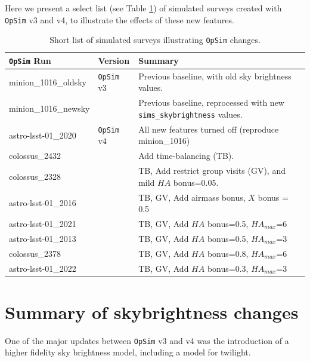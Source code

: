\documentclass[DM,lsstdraft,authoryear,toc]{lsstdoc}
\newcommand{\opsim}{\texttt{OpSim}\xspace}
\newcommand{\simsky}{\texttt{sims\_skybrightness}\xspace}
\begin{document}
Here we present a select list (see Table \ref{tab:runlist}) of simulated surveys created with \opsim v3 and v4, to illustrate the effects of these new features. 

\begin{table}[htp]
\caption{Short list of simulated surveys illustrating \opsim changes.}
\begin{center}
\begin{tabular}{ l | l | l }
\opsim Run & Version & Summary \\
\hline
minion\_1016\_oldsky & \opsim v3 & Previous baseline, with old sky brightness values. \\
minion\_1016\_newsky &  & Previous baseline, reprocessed with new \simsky values.\\
\hline
astro-lsst-01\_2020 & \opsim v4  & All new features turned off (reproduce minion\_1016) \\
colossus\_2432 &  & Add time-balancing (TB).\\
colossus\_2328 &  & TB, Add restrict group visits (GV), and mild $HA$ bonus=0.05. \\
astro-lsst-01\_2016 &  & TB, GV, Add airmass bonus, $X$ bonus = 0.5 \\
astro-lsst-01\_2021 & & TB, GV, Add $HA$ bonus=0.5, $HA_{max}$=6 \\
astro-lsst-01\_2013 &  & TB, GV, Add $HA$ bonus=0.5, $HA_{max}$=3 \\
colossus\_2378 &  &  TB, GV, Add $HA$ bonus=0.8, $HA_{max}$=6 \\
astro-lsst-01\_2022 &   & TB, GV, Add $HA$ bonus=0.3, $HA_{max}$=3 \\
\end{tabular} 
\end{center}
\label{tab:runlist}
\end{table}

\section{Summary of skybrightness changes}

One of the major updates between \opsim v3 and v4 was the introduction of a higher fidelity sky brightness model, including a model for twilight. 
\end{document}
